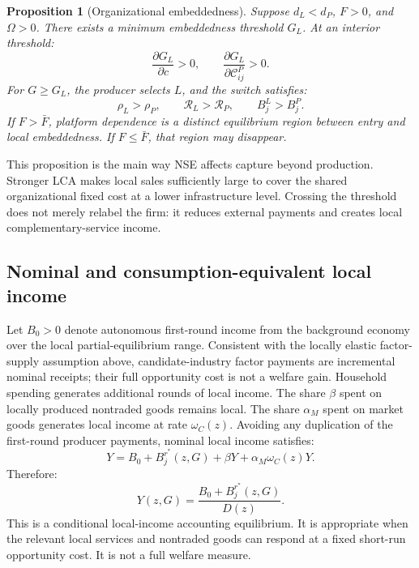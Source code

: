 \documentclass[11pt]{article}
\newtheorem{proposition}{Proposition}
\theoremstyle{definition}
\theoremstyle{remark}
\newcommand{\Rcal}{\mathcal R}
\begin{document}
\begin{proposition}[Organizational embeddedness]
\label{prop:embedding}
Suppose \(d_L<d_P\), \(F>0\), and \(\Omega>0\).  There exists a
minimum embeddedness threshold \(G_L\).  At an interior threshold:
\begin{equation}
 \frac{\partial G_L}{\partial c}>0,
 \qquad
 \frac{\partial G_L}{\partial\mathcal C^P_{ij}}>0.
 \label{eq:embedding_lca}
\end{equation}
For \(G\geq G_L\), the producer selects \(L\), and the switch satisfies:
\begin{equation}
 \rho_L>\rho_P,\qquad
 \Rcal_L>\Rcal_P,\qquad
 B_j^L>B_j^P.
 \label{eq:embedding_capture}
\end{equation}
If \(F>\bar F\), platform dependence is a distinct equilibrium region between
entry and local embeddedness.  If \(F\leq\bar F\), that region may disappear.
\end{proposition}

This proposition is the main way NSE affects capture beyond production.
Stronger LCA makes local sales sufficiently large to cover the shared
organizational fixed cost at a lower infrastructure level.  Crossing the
threshold does not merely relabel the firm: it reduces external payments and
creates local complementary-service income.

\subsection{Nominal and consumption-equivalent local income}

Let \(B_0>0\) denote autonomous first-round income from the background economy
over the local partial-equilibrium range.  Consistent with the locally elastic
factor-supply assumption above, candidate-industry factor payments are
incremental nominal receipts; their full opportunity cost is not a welfare
gain.  Household spending generates additional rounds of local income.  The share \(\beta\)
spent on locally produced nontraded goods remains local.  The share
\(\alpha_M\) spent on market goods generates local income at rate
\(\omega_C(z)\).  Avoiding any duplication of the first-round producer
payments, nominal local income satisfies:
\begin{equation}
 Y=
 B_0+B_j^{r^*}(z,G)
 +\beta Y+\alpha_M\omega_C(z)Y.
 \label{eq:income_fixed_point}
\end{equation}
Therefore:
\begin{equation}
 Y(z,G)=
 \frac{B_0+B_j^{r^*}(z,G)}
 {D(z)}.
 \label{eq:nominal_income}
\end{equation}
This is a conditional local-income accounting equilibrium.  It is appropriate
when the relevant local services and nontraded goods can respond at a fixed
short-run opportunity cost.  It is not a full welfare measure.
\end{document}
